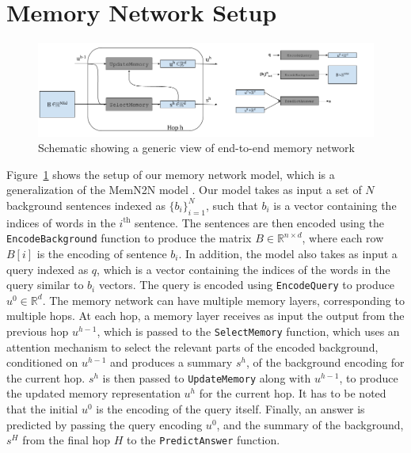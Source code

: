 \section{Memory Network Setup}
\begin{figure}
\begin{center}
  \includegraphics[width=6.5in]{figures/memory_network_generic.png}
  \caption{Schematic showing a generic view of end-to-end memory network}
  \label{fig:memnet}
  \end{center}
\end{figure}
Figure~\ref{fig:memnet} shows the setup of our memory network model, which is a
generalization of the MemN2N model \citep{sukhbaatar2015end}. Our model takes as
input a set of $N$ background sentences indexed as $\{b_i\}_{i=1}^N$, such that
$b_i$ is a vector containing the indices of words in the $i^\text{th}$ sentence.
The sentences are then encoded using the \texttt{EncodeBackground} function to
produce the matrix $B \in \mathbb{R}^{n \times d}$, where each row $B[i]$ is the
encoding of sentence $b_i$. In addition, the model also takes as input a query
indexed as $q$, which is a vector containing the indices of the words in the
query similar to $b_i$ vectors. The query is encoded using \texttt{EncodeQuery}
to produce $u^0 \in \mathbb{R}^d$. The memory network can have multiple memory
layers, corresponding to multiple hops. At each hop, a memory layer receives as
input the output from the previous hop $u^{h-1}$, which is passed to the
\texttt{SelectMemory} function, which uses an attention mechanism to select the
relevant parts of the encoded background, conditioned on $u^{h-1}$ and produces
a summary $s^h$, of the background encoding for the current hop. $s^h$ is then
passed to \texttt{UpdateMemory} along with $u^{h-1}$, to produce the updated
memory representation $u^h$ for the current hop. It has to be noted that the
initial $u^0$ is the encoding of the query itself. Finally, an answer is
predicted by passing the query encoding $u^0$, and the summary of the
background, $s^H$ from the final hop $H$ to the \texttt{PredictAnswer} function.

